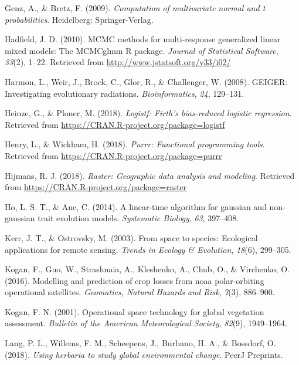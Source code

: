 \documentclass[man,floatsintext]{apa6}
\theoremstyle{definition}
\theoremstyle{definition}
\theoremstyle{definition}
\theoremstyle{remark}
\begin{document}
\leavevmode\hypertarget{ref-R-mvtnorm}{}%
Genz, A., \& Bretz, F. (2009). \emph{Computation of multivariate normal
and t probabilities}. Heidelberg: Springer-Verlag.

\leavevmode\hypertarget{ref-R-MCMCglmm}{}%
Hadfield, J. D. (2010). MCMC methods for multi-response generalized
linear mixed models: The MCMCglmm R package. \emph{Journal of
Statistical Software}, \emph{33}(2), 1--22. Retrieved from
\url{http://www.jstatsoft.org/v33/i02/}

\leavevmode\hypertarget{ref-R-geiger_d}{}%
Harmon, L., Weir, J., Brock, C., Glor, R., \& Challenger, W. (2008).
GEIGER: Investigating evolutionary radiations. \emph{Bioinformatics},
\emph{24}, 129--131.

\leavevmode\hypertarget{ref-R-logistf}{}%
Heinze, G., \& Ploner, M. (2018). \emph{Logistf: Firth's bias-reduced
logistic regression}. Retrieved from
\url{https://CRAN.R-project.org/package=logistf}

\leavevmode\hypertarget{ref-R-purrr}{}%
Henry, L., \& Wickham, H. (2018). \emph{Purrr: Functional programming
tools}. Retrieved from \url{https://CRAN.R-project.org/package=purrr}

\leavevmode\hypertarget{ref-R-raster}{}%
Hijmans, R. J. (2018). \emph{Raster: Geographic data analysis and
modeling}. Retrieved from
\url{https://CRAN.R-project.org/package=raster}

\leavevmode\hypertarget{ref-R-phylolm}{}%
Ho, L. S. T., \& Ane, C. (2014). A linear-time algorithm for gaussian
and non-gaussian trait evolution models. \emph{Systematic Biology},
\emph{63}, 397--408.

\leavevmode\hypertarget{ref-kerr2003space}{}%
Kerr, J. T., \& Ostrovsky, M. (2003). From space to species: Ecological
applications for remote sensing. \emph{Trends in Ecology \& Evolution},
\emph{18}(6), 299--305.

\leavevmode\hypertarget{ref-kogan2016modelling}{}%
Kogan, F., Guo, W., Strashnaia, A., Kleshenko, A., Chub, O., \&
Virchenko, O. (2016). Modelling and prediction of crop losses from noaa
polar-orbiting operational satellites. \emph{Geomatics, Natural Hazards
and Risk}, \emph{7}(3), 886--900.

\leavevmode\hypertarget{ref-kogan2001operational}{}%
Kogan, F. N. (2001). Operational space technology for global vegetation
assessment. \emph{Bulletin of the American Meteorological Society},
\emph{82}(9), 1949--1964.

\leavevmode\hypertarget{ref-lang2018using}{}%
Lang, P. L., Willems, F. M., Scheepens, J., Burbano, H. A., \& Bossdorf,
O. (2018). \emph{Using herbaria to study global environmental change}.
PeerJ Preprints.
\end{document}
